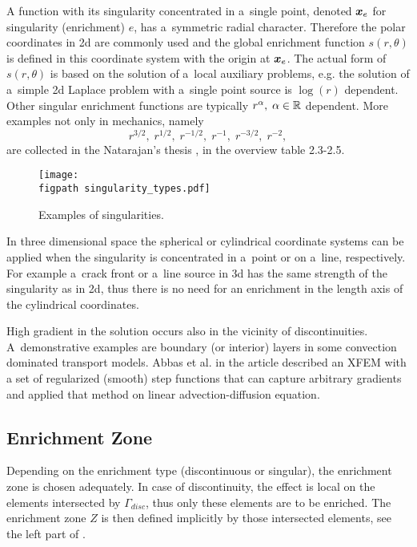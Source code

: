 A function with its singularity concentrated in a~single point, denoted $\mathbf{\boldsymbol{x}}_e$ for singularity (enrichment) $e$, has a~symmetric radial character.
Therefore the polar coordinates in 2d are commonly used and the global enrichment function $s(r,\theta)$ is defined in this coordinate system with the origin at $\mathbf{\boldsymbol{x}}_e$.
The actual form of $s(r,\theta)$ is based on the solution of a~local auxiliary problems, e.g. the solution of a~simple 2d Laplace problem with a~single point source 
is $\log(r)$ dependent. Other singular enrichment functions are typically $r^\alpha,\;\alpha\in\mathbb{R}$ dependent.
More examples not only in mechanics, namely
\[ r^{3/2},\;r^{1/2},\;r^{-1/2},\;r^{-1},\;r^{-3/2},\; r^{-2}, \]
are collected in the Natarajan's thesis \cite{natarajan_enriched_2011}, in the overview table 2.3-2.5.
%
\begin{figure}[!htb]
  \centering    
    \texttt{[image: \\figpath singularity\_types.pdf]}
  \caption{Examples of singularities. }
  \label{fig:types_of_singularities}
\end{figure}

In three dimensional space the spherical or cylindrical coordinate systems can be applied when the singularity is concentrated in a~point or on a~line, respectively.
For example a~crack front or a~line source in 3d has the same strength of the singularity as in 2d, thus there is no need for an enrichment in the length axis
of the cylindrical coordinates.

High gradient in the solution occurs also in the vicinity of discontinuities. A~de\-mon\-strative examples are boundary (or interior) layers
in some convection dominated transport models. Abbas et al. in the article \cite{abbas_alizada_fries_highgradient_2010} described an XFEM with
a set of regularized (smooth) step functions that can capture arbitrary gradients and applied that method on linear advection-diffusion equation.

\subsection{Enrichment Zone} \label{sec:glob_enr_zone}
Depending on the enrichment type (discontinuous or singular), the enrichment zone is chosen adequately.
In case of discontinuity, the effect is local on the elements intersected by $\Gamma_{disc}$, thus only
these elements are to be enriched. The enrichment zone $Z$ is then defined implicitly by those intersected elements,
see the left part of .

